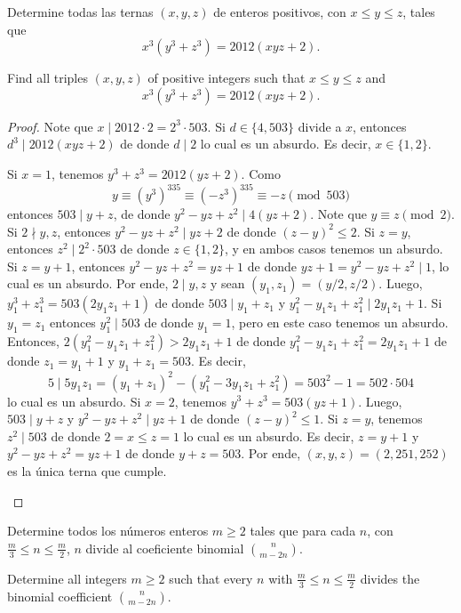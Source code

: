 \begin{probEG}[ISL 2012/N2]
	Determine todas las ternas $(x,y,z)$ de enteros positivos, con $x\le y\le z$, tales que
	\[x^3(y^3+z^3)=2012(xyz+2).\]
	\begin{hint}
		Find all triples $(x,y,z)$ of positive integers such that $x\le y\le z$ and
		\[x^3(y^3+z^3)=2012(xyz+2).\]
	\end{hint}
\end{probEG}

\begin{proof}
	Note que $x\mid 2012\cdot 2=2^3\cdot 503$. Si $d\in\{4,503\}$ divide a $x$, entonces $d^3\mid 2012(xyz+2)$ de donde $d\mid 2$ lo cual es un absurdo. Es decir, $x\in\{1,2\}$.
	\begin{itemize}
		\ii Si $x=1$, tenemos $y^3+z^3=2012(yz+2)$. Como
		\[y\equiv\left(y^3\right)^{335}\equiv\left(-z^3\right)^{335}\equiv-z\pmod{503}\]
		entonces $503\mid y+z$, de donde $y^2-yz+z^2\mid 4(yz+2)$. Note que $y\equiv z\pmod 2$. Si $2\nmid y,z$, entonces $y^2-yz+z^2\mid yz+2$ de donde $(z-y)^2\le 2$. Si $z=y$, entonces $z^2\mid 2^2\cdot 503$ de donde $z\in\{1,2\}$, y en ambos casos tenemos un absurdo. Si $z=y+1$, entonces $y^2-yz+z^2=yz+1$ de donde $yz+1=y^2-yz+z^2\mid 1$, lo cual es un absurdo. Por ende, $2\mid y,z$ y sean $(y_1,z_1)=(y/2,z/2)$. Luego, $y_1^3+z_1^3=503(2y_1z_1+1)$ de donde $503\mid y_1+z_1$ y $y_1^2-y_1z_1+z_1^2\mid 2y_1z_1+1$. Si $y_1=z_1$ entonces $y_1^2\mid 503$ de donde $y_1=1$, pero en este caso tenemos un absurdo. Entonces, $2(y_1^2-y_1z_1+z_1^2)>2y_1z_1+1$ de donde $y_1^2-y_1z_1+z_1^2=2y_1z_1+1$ de donde $z_1=y_1+1$ y $y_1+z_1=503$. Es decir,
		\[5\mid 5y_1z_1=(y_1+z_1)^2-(y_1^2-3y_1z_1+z_1^2)=503^2-1=502\cdot 504\]
		lo cual es un absurdo.
	\ii Si $x=2$, tenemos $y^3+z^3=503(yz+1)$. Luego, $503\mid y+z$ y $y^2-yz+z^2\mid yz+1$ de donde $(z-y)^2\le 1$. Si $z=y$, tenemos $z^2\mid 503$ de donde $2=x\le z=1$ lo cual es un absurdo. Es decir, $z=y+1$ y $y^2-yz+z^2=yz+1$ de donde $y+z=503$. Por ende, $(x,y,z)=(2,251,252)$ es la única terna que cumple.
	\end{itemize}
\end{proof}

\begin{probEG}[ISL 2012/N3]
	Determine todos los números enteros $m\ge 2$ tales que para cada $n$, con $\frac m3\le n\le\frac m2$, $n$ divide al coeficiente binomial $\binom{n}{m-2n}$.
	\begin{hint}
		Determine all integers $m\ge 2$ such that every $n$ with $\frac m3\le n\le\frac m2$ divides the binomial coefficient $\binom{n}{m-2n}$.
	\end{hint}
\end{probEG}

